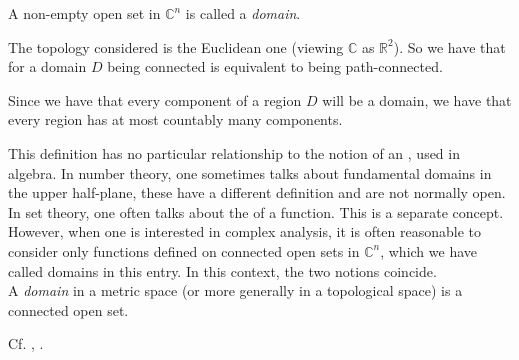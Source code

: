 \documentclass{article}
\begin{document}
A  non-empty open set in $\mathbb{C}^n$ is called a \emph{domain}.

The topology considered is the Euclidean one (viewing $\mathbb{C}$ as $\mathbb{R}^2$). So we have that for a domain $D$ being connected is equivalent to being path-connected.

Since we have that every component of a region $D$ will be a domain, we have that every region has at most countably many components.

This definition has no particular relationship to the notion of an , used in algebra.  In number theory, one sometimes talks about fundamental domains in the upper half-plane, these have a different definition and are not normally open.  In set theory, one often talks about the  of a function.  This is a separate concept.  However, when one is interested in complex analysis, it is often reasonable to consider only functions defined on connected open sets in $\mathbb{C}^n$, which we have called domains in this entry.  In this context, the two notions coincide.\\

A \emph{domain} in a metric space (or more generally in a topological space) is a connected open set.

Cf. , 
.
\end{document}
